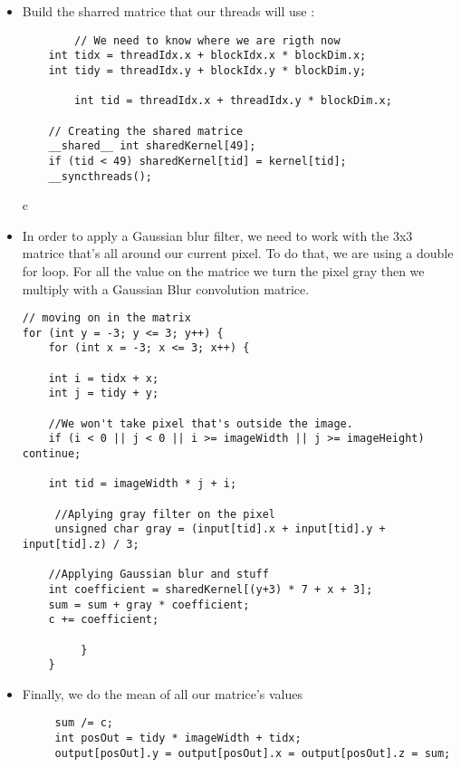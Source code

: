 \documentclass[paper=a4, fontsize=11pt]{scrartcl}
\begin{document}
    \begin{itemize}
        \item Build the sharred matrice that our threads will use :
    
    \begin{verbatim}
    	// We need to know where we are rigth now
	int tidx = threadIdx.x + blockIdx.x * blockDim.x;
	int tidy = threadIdx.y + blockIdx.y * blockDim.y;
	
        int tid = threadIdx.x + threadIdx.y * blockDim.x;
	 
	// Creating the shared matrice
   	__shared__ int sharedKernel[49];
    if (tid < 49) sharedKernel[tid] = kernel[tid]; 
    __syncthreads();
    \end{verbatim}{c}
        \newpage
        \item In order to apply a Gaussian blur filter, we need to work with the 3x3 matrice that's all around our current pixel. To do that, we are using a double for loop. For all the value on the matrice we turn the pixel gray then we multiply with a Gaussian Blur convolution matrice.
        
    \begin{verbatim}
// moving on in the matrix
for (int y = -3; y <= 3; y++) {
    for (int x = -3; x <= 3; x++) {	
                	
	int i = tidx + x;
	int j = tidy + y;
		            
	//We won't take pixel that's outside the image.
    if (i < 0 || j < 0 || i >= imageWidth || j >= imageHeight) continue;
		            
	int tid = imageWidth * j + i; 
		            
	 //Aplying gray filter on the pixel
	 unsigned char gray = (input[tid].x + input[tid].y + input[tid].z) / 3;
		            
	//Applying Gaussian blur and stuff
	int coefficient = sharedKernel[(y+3) * 7 + x + 3];
	sum = sum + gray * coefficient;
	c += coefficient;
		            
         }
    }
    \end{verbatim}
    
    \item Finally, we do the mean of all our matrice's values
    
    \begin{verbatim}
     sum /= c;
     int posOut = tidy * imageWidth + tidx;
     output[posOut].y = output[posOut].x = output[posOut].z = sum;
    \end{verbatim}
    \end{itemize}\newpage
    
\end{document}
